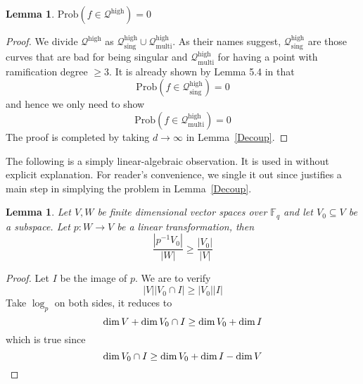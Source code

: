 \documentclass[12pt]{article}
\theoremstyle{plain}
\newtheorem{lemma}[equation]{Lemma}
\theoremstyle{definition}
\newcommand{\IF}{\mathbb{F}}
\newcommand{\sQ}{\mathcal{Q}}
\renewcommand\dim{{\rm dim\,}}
\newcommand{\<}{\langle}
\renewcommand{\>}{\rangle}
\newcommand{\Prob}{\mathrm{Prob}}
\begin{document}
\begin{lemma}
\label{High}
$\Prob( f\in \sQ^{\mathrm{high}}) = 0$
\end{lemma}
\begin{proof}
We divide $\sQ^{\mathrm{high}}$ as $\sQ^{\mathrm{high}}_{\mathrm{sing}} \cup \sQ^{\mathrm{high}}_{\mathrm{multi}}$. As their names suggest, $\sQ^{\mathrm{high}}_{\mathrm{sing}}$ are those curves that are bad for being singular and $\sQ^{\mathrm{high}}_{\mathrm{multi}}$ for having a point with ramification degree $\ge 3$. 
It is already shown by Lemma 5.4 in \cite{Wood} that $$ \Prob(f \in \sQ^{\mathrm{high}}_{\mathrm{sing}}) = 0 $$ and hence we only need to show
$$ \Prob(f \in \sQ^{\mathrm{high}}_{\mathrm{multi}}) = 0 $$
The proof is completed by taking $d \to \infty$ in Lemma~\ref{Decoup}. 
\end{proof}
 
The following is a simply linear-algebraic observation. It is used in \cite{Wood} without explicit explanation. For reader's convenience, we single it out since justifies a main step in simplying the problem in Lemma~\ref{Decoup}. 
\begin{lemma}
\label{linear}
Let $V, W$ be finite dimensional vector spaces over $\IF_q$ and let $V_0 \subseteq V$ be a subspace. Let $p : W \to V$ be a linear transformation, then 
$$ \frac{|p^{-1} V_0|}{|W|} \ge \frac{|V_0|}{|V|}$$
\end{lemma}
\begin{proof}
Let $I$ be the image of $p$. We are to verify 
$$ |V||V_0 \cap I| \ge |V_0||I| $$
Take $\log_p$ on both sides, it reduces to 
$$ \dim V  + \dim V_0 \cap I \ge \dim V_0 + \dim I$$
which is true since 
$$ \dim V_0 \cap I \ge \dim V_0 + \dim I - \dim V $$  
\end{proof}
\end{document}
